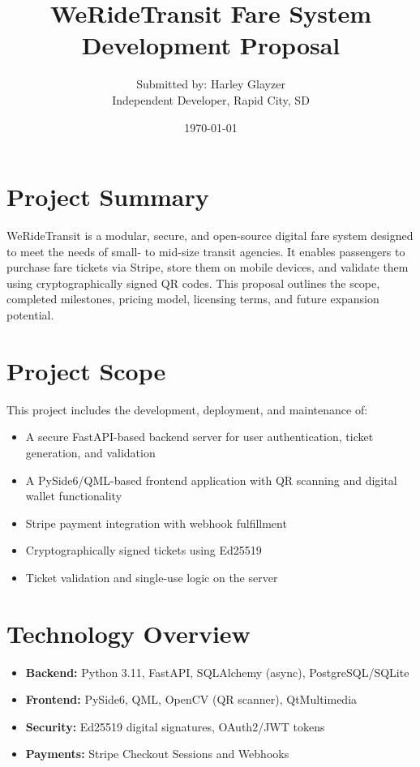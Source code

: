 \documentclass[12pt]{article}
\title{WeRideTransit Fare System Development Proposal}
\author{Submitted by: Harley Glayzer\\
Independent Developer, Rapid City, SD}
\date{\today}
\begin{document}
\maketitle

\section{Project Summary}
WeRideTransit is a modular, secure, and open-source digital fare system designed to meet the needs of small- to mid-size transit agencies. It enables passengers to purchase fare tickets via Stripe, store them on mobile devices, and validate them using cryptographically signed QR codes. This proposal outlines the scope, completed milestones, pricing model, licensing terms, and future expansion potential.

\section{Project Scope}
This project includes the development, deployment, and maintenance of:

\begin{itemize}[itemsep=0.5em]
    \item A secure FastAPI-based backend server for user authentication, ticket generation, and validation
    \item A PySide6/QML-based frontend application with QR scanning and digital wallet functionality
    \item Stripe payment integration with webhook fulfillment
    \item Cryptographically signed tickets using Ed25519
    \item Ticket validation and single-use logic on the server
\end{itemize}

\section{Technology Overview}
\begin{itemize}[itemsep=0.5em]
    \item \textbf{Backend:} Python 3.11, FastAPI, SQLAlchemy (async), PostgreSQL/SQLite
    \item \textbf{Frontend:} PySide6, QML, OpenCV (QR scanner), QtMultimedia
    \item \textbf{Security:} Ed25519 digital signatures, OAuth2/JWT tokens
    \item \textbf{Payments:} Stripe Checkout Sessions and Webhooks
\end{itemize}
\end{document}
